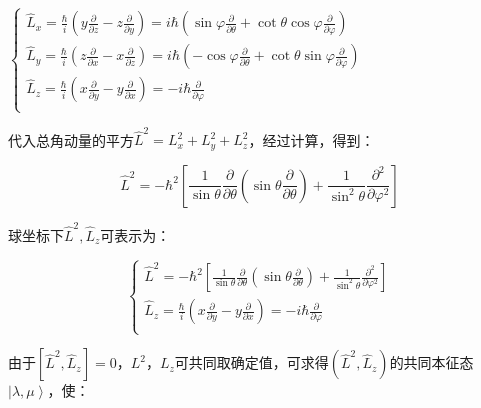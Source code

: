 \begin{center}
$\left\{ \begin{array}{l}
 \widehat L_x  = \frac{\hbar }{i}\left( {y\frac{\partial }{{\partial z}} - z\frac{\partial }{{\partial y}}} \right) = i\hbar \left( {\sin \varphi \frac{\partial }{{\partial \theta }} + \cot \theta \cos \varphi \frac{\partial }{{\partial \varphi }}} \right) \\
 \widehat L_y  = \frac{\hbar }{i}\left( {z\frac{\partial }{{\partial x}} - x\frac{\partial }{{\partial z}}} \right) = i\hbar \left( { - \cos \varphi \frac{\partial }{{\partial \theta }} + \cot \theta \sin \varphi \frac{\partial }{{\partial \varphi }}} \right) \\
 \widehat L_z  = \frac{\hbar }{i}\left( {x\frac{\partial }{{\partial y}} - y\frac{\partial }{{\partial x}}} \right) =  - i\hbar \frac{\partial }{{\partial \varphi }} \\
 \end{array} \right.$
\end{center}

代入总角动量的平方$\hat L^2 = L_x^2 + L_y^2 + L_z^2$，经过计算，得到：

\begin{equation}
\widehat L^2   =  - \hbar ^2 \left[ {\frac{1}{{\sin \theta }}\frac{\partial }{{\partial \theta }}\left( {\sin \theta \frac{\partial }{{\partial \theta }}} \right) + \frac{1}{{\sin ^2 \theta }}\frac{{\partial ^2 }}{{\partial \varphi ^2 }}} \right]
\end{equation}


球坐标下$\widehat L^2 ,\widehat L_z $可表示为：

\begin{equation}\label{14-1}
\left\{ \begin{array}{l}
 \widehat L^2  =  - \hbar ^2 \left[ {\frac{1}{{\sin \theta }}\frac{\partial }{{\partial \theta }}\left( {\sin \theta \frac{\partial }{{\partial \theta }}} \right) + \frac{1}{{\sin ^2 \theta }}\frac{{\partial ^2 }}{{\partial \varphi ^2 }}} \right] \\
 \widehat L_z  = \frac{\hbar }{i}\left( {x\frac{\partial }{{\partial y}} - y\frac{\partial }{{\partial x}}} \right) =  - i\hbar \frac{\partial }{{\partial \varphi }} \\
 \end{array} \right.
\end{equation}

由于$\left[ {\widehat L^2 ,\widehat L_z } \right] = 0$，$L^2$，$L_z$可共同取确定值，可求得$\left( {\widehat L^2 ,\widehat L_z } \right)$的共同本征态$\left| \lambda, \mu \right\rangle$，使：


